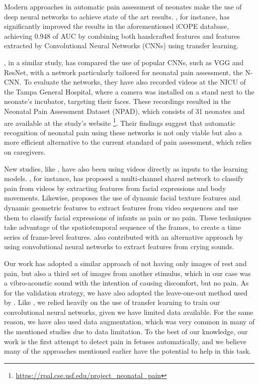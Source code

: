 Modern approaches in automatic pain assessment of neonates make the use of deep neural networks to achieve state of the art results. \cite{abs-1807-01631}, for instance, has significantly improved the results in the aforementioned iCOPE database, achieving 0.948 of AUC by combining both handcrafted features and features extracted by Convolutional Neural Networks (CNNs) using transfer learning.  

\cite{Zamzmi2019}, in a similar study, has compared the use of popular CNNs, such as VGG and ResNet, with a network particularly tailored for neonatal pain assessment, the N-CNN. To evaluate the networks, they have also recorded videos at the NICU of the Tampa General Hospital, where a camera was installed on a stand next to the neonate's incubator, targeting their faces. These recordings resulted in the Neonatal Pain Assessment Dataset (NPAD), which consists of 31 neonates and are available at the study's website \footnote{\url{https://rpal.cse.usf.edu/project\_neonatal\_pain}}. Their findings suggest that automatic recognition of neonatal pain using these networks is not only viable but also a more efficient alternative to the current standard of pain assessment, which relies on caregivers.

New studies, like \cite{Fotiadou2014}, have also been using videos directly as inputs to the learning models. \cite{SalekinZGKH019}, for instance, has proposed a multi-channel shared network to classify pain from videos by extracting features from facial expressions and body movements. Likewise, \citep{Zhi2018b} proposes the use of dynamic facial texture features and dynamic geometric features to extract features from video sequences and use them to classify facial expressions of infants as pain or no pain. These techniques take advantage of the spatiotemporal sequence of the frames, to create a time series of frame-level features. \citep{abs-1909-02543} also contributed with an alternative approach by using convolutional neural networks to extract features from crying sounds. 

Our work has adopted a similar approach of not having only images of rest and pain, but also a third set of images from another stimulus, which in our case was a vibro-acoustic sound with the intention of causing discomfort, but no pain. As for the validation strategy, we have also adopted the leave-one-out method used by \cite{Brahnam2006}. Like \cite{abs-1807-01631}, we relied heavily on the use of transfer learning to train our convolutional neural networks, given we have limited data available. For the same reason, we have also used data augmentation, which was very common in many of the mentioned studies due to data limitation. To the best of our knowledge, our work is the first attempt to detect pain in fetuses automatically, and we believe many of the approaches mentioned earlier have the potential to help in this task. 
